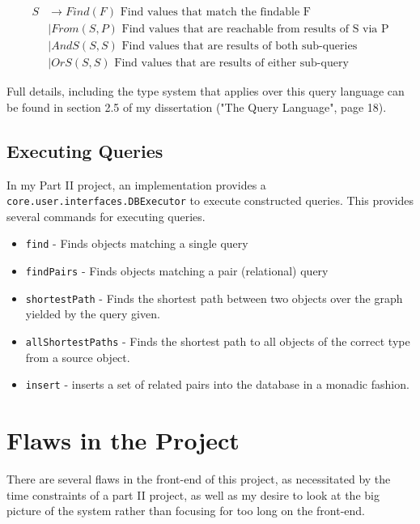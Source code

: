 \documentclass{report}
\newcommand \2[0]{\textbf{2}}
\newcommand \3[0]{\textbf{3}}
\begin{document}
    \begin{equation}\label{SingleQueries}
        \begin{split}
        S & \rightarrow Find(F) \mbox{ Find values that match the findable F}\\
        &\mid From(S, P) \mbox{ Find values that are reachable from results of S via P}\\
        &\mid AndS(S, S) \mbox{ Find values that are results of both sub-queries}\\
        &\mid OrS(S, S) \mbox{ Find values that are results of either sub-query}
        \end{split}
    \end{equation} 

Full details, including the type system that applies over this query language can be found in section 2.5 of my dissertation ("The Query Language", page 18).

\subsection{Executing Queries}\label{Commands}
In my Part II project, an implementation provides a \texttt{core.user.interfaces.DBExecutor} to execute constructed queries. This provides several commands for executing queries.

\begin{itemize}
    \item \texttt{find} - Finds objects matching a single query
    \item \texttt{findPairs} - Finds objects matching a pair (relational) query
    \item \texttt{shortestPath} - Finds the shortest path between two objects over the graph yielded by the query given.
    \item \texttt{allShortestPaths} - Finds the shortest path to all objects of the correct type from a source object.
    \item \texttt{insert} - inserts a set of related pairs into the database in a monadic fashion.
\end{itemize}



\section{Flaws in the Project}
There are several flaws in the front-end of this project, as necessitated by the time constraints of a part II project, as well as my desire to look at the big picture of the system rather than focusing for too long on the front-end.
\end{document}
